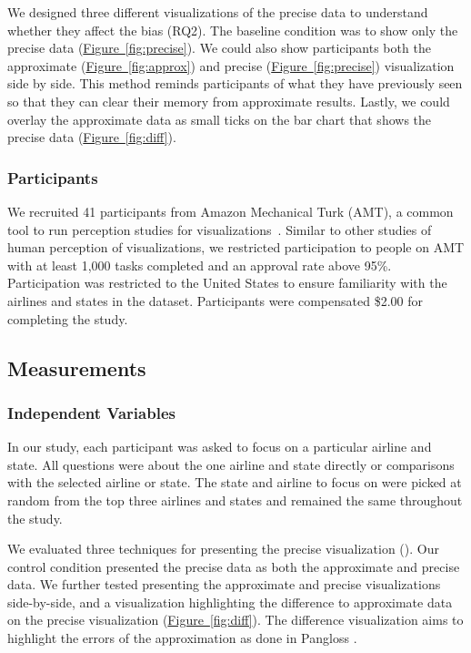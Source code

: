 \documentclass[10pt,journal,compsoc]{IEEEtran}
\newcommand{\figref}[1]{\hyperref[#1]{Figure~\ref*{#1}}}
\begin{document}
We designed three different visualizations of the precise data to understand whether they affect the bias (RQ2).
The baseline condition was to show only the precise data (\figref{fig:precise}).
We could also show participants both the approximate (\figref{fig:approx}) and precise (\figref{fig:precise}) visualization side by side.
This method reminds participants of what they have previously seen so that they can clear their memory from approximate results.
Lastly, we could overlay the approximate data as small ticks on the bar chart that shows the precise data (\figref{fig:diff}).

\subsubsection{Participants}

We recruited 41 participants from Amazon Mechanical Turk (AMT), a common tool to run perception studies for visualizations~\cite{heer2010crowdsourcing}.
Similar to other studies of human perception of visualizations, we restricted participation to people on AMT with at least 1,000 tasks completed and an approval rate above 95\%.
Participation was restricted to the United States to ensure familiarity with the airlines and states in the dataset.
Participants were compensated \$2.00 for completing the study.

\subsection{Measurements}
\subsubsection{Independent Variables}

In our study, each participant was asked to focus on a particular airline and state.
All questions were about the one airline and state directly or comparisons with the selected airline or state.
The state and airline to focus on were picked at random from the top three airlines and states and remained the same throughout the study.

We evaluated three techniques for presenting the precise visualization ().
Our control condition presented the precise data as both the approximate and precise data.
We further tested presenting the approximate and precise visualizations side-by-side, and a visualization highlighting the difference to approximate data on the precise visualization (\figref{fig:diff}).
The difference visualization aims to highlight the errors of the approximation as done in Pangloss \cite{moritz2017pangloss}.
\end{document}

